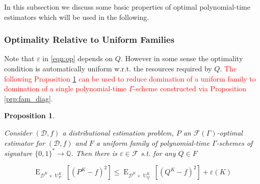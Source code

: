 \documentclass[11pt]{article}
\numberwithin{equation}{section}
\theoremstyle{definition}
\theoremstyle{plain}
\newtheorem{proposition}{Proposition}[section]
\newcommand{\Bool}{\{0,1\}}
\newcommand{\Words}{{\Bool^*}}
\DeclareMathOperator{\E}{E}
\DeclareMathOperator{\Un}{U}
\newcommand{\Rats}{\mathbb{Q}}
\newcommand{\Dist}{\mathcal{D}}
\newcommand{\Fall}{\mathcal{F}}
\newcommand{\EG}{\Fall(\Gamma)}
\begin{document}
In this subsection we discuss some basic properties of optimal polynomial-time estimators which will be used in the following.

\subsubsection{Optimality Relative to Uniform Families}

Note that $\varepsilon$ in \ref{eqn:op} depends on $Q$. However in some sense the optimality condition is automatically uniform w.r.t. the resources required by $Q$. \textcolor{red}{The following Proposition \ref{prp:unif} can be used to reduce domination of a uniform family to domination of a single polynomial-time $\Gamma$-scheme constructed via Proposition \ref{prp:fam_diag}.}

\begin{proposition}
\label{prp:unif}

Consider $(\Dist,f)$ a distributional estimation problem, $P$ an $\EG$-optimal estimator for $(\Dist,f)$ and $F$ a uniform family of polynomial-time $\Gamma$-schemes of signature $\Words \rightarrow \Rats$. Then there is $\varepsilon \in \Fall$ s.t. for any $Q \in F$

\begin{equation}
\E_{\Dist^{K} \times \Un_P^{K}}[(P^{K} - f)^2] \leq \E_{\Dist^{K} \times \Un_Q^{K}}[(Q^{K} - f)^2] + \varepsilon(K)
\end{equation}

\end{proposition}
\end{document}
